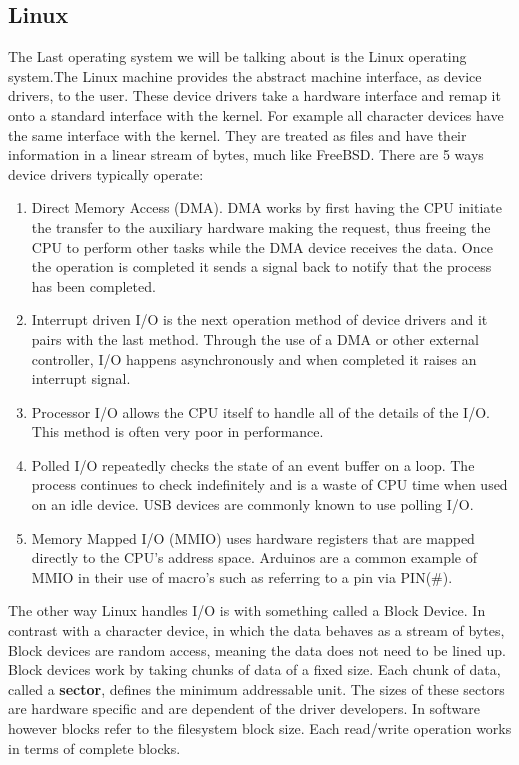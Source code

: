 \documentclass[a4paper,10pt,onecolumn]{article}
\begin{document}
\subsection{Linux}
The Last operating system we will be talking about is the Linux operating system.The Linux machine provides the abstract machine interface, as device drivers, to the user. These device drivers take a hardware interface and remap it onto a standard interface with the kernel. For example all character devices have the same interface with the kernel. They are treated as files and have their information in a linear stream of bytes, much like FreeBSD. There are 5 ways device drivers typically operate:
\begin{enumerate}
\item Direct Memory Access (DMA). DMA works by first having the CPU initiate the transfer to the auxiliary hardware making the request, thus freeing the CPU to perform other tasks while the DMA device receives the data. Once the operation is completed it sends a signal back to notify that the process has been completed.
\item Interrupt driven I/O is the next operation method of device drivers and it pairs with the last method. Through the use of a DMA or other external controller, I/O happens asynchronously and when completed it raises an interrupt signal.
\item Processor I/O allows the CPU itself to handle all of the details of the I/O. This method is often very poor in performance.
\item Polled I/O repeatedly checks the state of an event buffer on a loop. The process continues to check indefinitely and is a waste of CPU time when used on an idle device. USB devices are commonly known to use polling I/O.
\item Memory Mapped I/O (MMIO) uses hardware registers that are mapped directly to the CPU's address space. Arduinos are a common example of MMIO in their use of macro's such as referring to a pin via PIN(\#).
\end{enumerate}
The other way Linux handles I/O is with something called a Block Device. In contrast with a character device, in which the data behaves as a stream of bytes, Block devices are random access, meaning the data does not need to be lined up. Block devices work by taking chunks of data of a fixed size. Each chunk of data, called a \textbf{sector}, defines the minimum addressable unit. The sizes of these sectors are hardware specific and are dependent of the driver developers. In software however blocks refer to the filesystem block size. Each read/write operation works in terms of complete blocks. 
\end{document}
